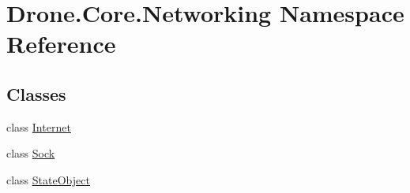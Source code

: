 \hypertarget{namespace_drone_1_1_core_1_1_networking}{}\section{Drone.\+Core.\+Networking Namespace Reference}
\label{namespace_drone_1_1_core_1_1_networking}
\subsection*{Classes}
\begin{DoxyCompactItemize}
\item 
class \hyperlink{class_drone_1_1_core_1_1_networking_1_1_internet}{Internet}
\item 
class \hyperlink{class_drone_1_1_core_1_1_networking_1_1_sock}{Sock}
\item 
class \hyperlink{class_drone_1_1_core_1_1_networking_1_1_state_object}{State\+Object}
\end{DoxyCompactItemize}
